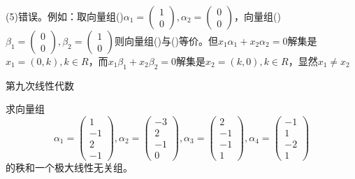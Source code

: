 \documentclass[a4paper]{report}
\begin{document}
\begin{jie}
(5)错误。例如：取向量组(\uppercase\expandafter{})$\alpha_1=
\begin{pmatrix}
1\\ 0
\end{pmatrix}
,\alpha_2=
\begin{pmatrix}
0 \\0
\end{pmatrix}$，向量组(\uppercase\expandafter{})$\beta_1=
\begin{pmatrix}
0\\ 0
\end{pmatrix}
,\beta_2=
\begin{pmatrix}
1 \\0
\end{pmatrix}$则向量组(\uppercase\expandafter{})与(\uppercase\expandafter{})等价。但$x_1\alpha_1+x_2\alpha_2=0$解集是$x_1=(0,k),k\in R$，而$x_1\beta_1+x_2\beta_2=0$解集是$x_2=(k,0),k\in R$，显然$x_1\neq x_2$
\end{jie}
\clearpage
\hphantom{~~}\hfill {\heiti 第九次线性代数} \hfill\hphantom{~~}

\hphantom{~~}

\EX 求向量组
\begin{equation*}
\alpha_1=
\begin{pmatrix}
1\\ -1\\ 2\\ -1
\end{pmatrix},
\alpha_2=
\begin{pmatrix}
-3\\ 2\\ -1\\ 0
\end{pmatrix},
\alpha_3=
\begin{pmatrix}
2\\ -1\\-1\\ 1
\end{pmatrix},
\alpha_4=
\begin{pmatrix}
-1\\ 1\\ -2\\ 1
\end{pmatrix}
\end{equation*}
的秩和一个极大线性无关组。
\end{document}
